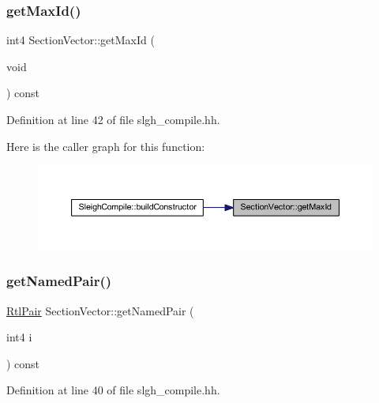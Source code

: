 \subsubsection{\texorpdfstring{getMaxId()}{getMaxId()}}
{\footnotesize\ttfamily int4 Section\+Vector\+::get\+Max\+Id (\begin{DoxyParamCaption}\item[{void}]{ }\end{DoxyParamCaption}) const\hspace{0.3cm}{\ttfamily [inline]}}



Definition at line 42 of file slgh\+\_\+compile.\+hh.

Here is the caller graph for this function\+:
\nopagebreak
\begin{figure}[H]
\begin{center}
\leavevmode
\includegraphics[width=350pt]{class_section_vector_a1656d5dbb035df63c1c943bdf5e8191a_icgraph}
\end{center}
\end{figure}
\mbox{\label{class_section_vector_a01124141c2c503818d5728ecb202712c}} 
\subsubsection{\texorpdfstring{getNamedPair()}{getNamedPair()}}
{\footnotesize\ttfamily \mbox{\hyperlink{struct_rtl_pair}{Rtl\+Pair}} Section\+Vector\+::get\+Named\+Pair (\begin{DoxyParamCaption}\item[{int4}]{i }\end{DoxyParamCaption}) const\hspace{0.3cm}{\ttfamily [inline]}}



Definition at line 40 of file slgh\+\_\+compile.\+hh.

\mbox{\label{class_section_vector_a5c581abab0689b485d9e6c567e5d606d}} 

